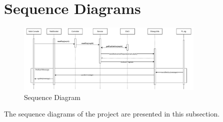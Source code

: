 \newpage
\section{Sequence Diagrams}

\begin{figure}[ht!]
    \centering
    \includegraphics[width=0.8\textwidth]{images/2_analisys/FL_sequence_diagram.png}
    \caption{Sequence Diagram}
    \label{fig:sequence_diagram}
\end{figure}

The sequence diagrams of the project are presented in this subsection.

